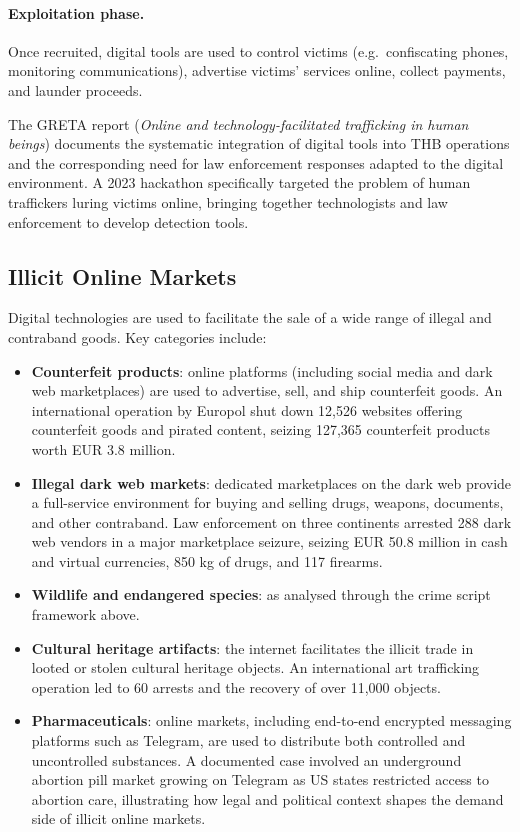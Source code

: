 \documentclass[11pt,a4paper,openany]{report}
\theoremstyle{definition}
\theoremstyle{plain}
\theoremstyle{remark}
\begin{document}
\paragraph{Exploitation phase.}
Once recruited, digital tools are used to control victims (e.g.\ confiscating phones, monitoring communications), advertise victims' services online, collect payments, and launder proceeds.

The GRETA report (\textit{Online and technology-facilitated trafficking in human beings}) documents the systematic integration of digital tools into THB operations and the corresponding need for law enforcement responses adapted to the digital environment. A 2023 hackathon specifically targeted the problem of human traffickers luring victims online, bringing together technologists and law enforcement to develop detection tools.

\subsection{Illicit Online Markets}

Digital technologies are used to facilitate the sale of a wide range of illegal and contraband goods. Key categories include:

\begin{itemize}
    \item \textbf{Counterfeit products}: online platforms (including social media and dark web marketplaces) are used to advertise, sell, and ship counterfeit goods. An international operation by Europol shut down 12,526 websites offering counterfeit goods and pirated content, seizing 127,365 counterfeit products worth EUR 3.8 million.
    \item \textbf{Illegal dark web markets}: dedicated marketplaces on the dark web provide a full-service environment for buying and selling drugs, weapons, documents, and other contraband. Law enforcement on three continents arrested 288 dark web vendors in a major marketplace seizure, seizing EUR 50.8 million in cash and virtual currencies, 850 kg of drugs, and 117 firearms.
    \item \textbf{Wildlife and endangered species}: as analysed through the crime script framework above.
    \item \textbf{Cultural heritage artifacts}: the internet facilitates the illicit trade in looted or stolen cultural heritage objects. An international art trafficking operation led to 60 arrests and the recovery of over 11,000 objects.
    \item \textbf{Pharmaceuticals}: online markets, including end-to-end encrypted messaging platforms such as Telegram, are used to distribute both controlled and uncontrolled substances. A documented case involved an underground abortion pill market growing on Telegram as US states restricted access to abortion care, illustrating how legal and political context shapes the demand side of illicit online markets.
\end{itemize}
\end{document}
